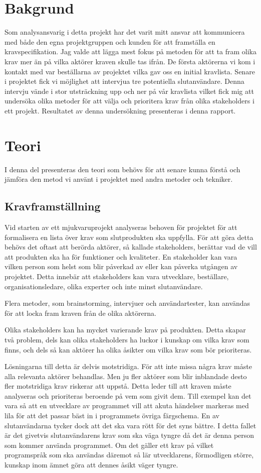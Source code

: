 \section{Bakgrund}
Som analysansvarig i detta projekt har det varit mitt ansvar att kommunicera med både den egna projektgruppen och kunden för att framställa en kravspecifikation. Jag valde att lägga mest fokus på metoden för att ta fram olika krav mer än på vilka aktörer kraven skulle tas ifrån. De första aktörerna vi kom i kontakt med var beställarna av projektet vilka gav oss en initial kravlista. Senare i projektet fick vi möjlighet att intervjua tre potentiella slutanvändare. Denna intervju vände i stor utsträckning upp och ner på vår kravlista vilket fick mig att undersöka olika metoder för att välja och prioritera krav från olika stakeholders i ett projekt. Resultatet av denna undersökning presenteras i denna rapport.

\section{Teori}
I denna del presenteras den teori som behövs för att senare kunna förstå och jämföra den metod vi använt i projektet med andra metoder och tekniker.

\subsection{Kravframställning}
Vid starten av ett mjukvaruprojekt analyseras behoven för projektet för att formalisera en lista över krav som slutprodukten ska uppfylla. För att göra detta behövs det oftast att berörda aktörer, så kallade stakeholders, berättar vad de vill att produkten ska ha för funktioner och kvaliteter. En stakeholder kan vara vilken person som helst som blir påverkad av eller kan påverka utgången av projektet. Detta innebär att stakeholders kan vara  utvecklare, beställare, organisationsledare, olika experter och inte minst slutanvändare.

Flera metoder, som brainstorming, intervjuer och användartester, kan användas för att locka fram kraven från de olika aktörerna.

Olika stakeholders kan ha mycket varierande krav på produkten. Detta skapar två problem, dels kan olika stakeholders ha luckor i kunskap om vilka krav som finns, och dels så kan aktörer ha olika åsikter om vilka krav som bör prioriteras.

Lösningarna till detta är delvis motstridiga. För att inte missa några krav måste alla relevanta aktörer behandlas. Men ju fler aktörer som blir inblandade desto fler motstridiga krav riskerar att uppstå. Detta leder till att kraven måste analyseras och prioriteras beroende på vem som givit dem.
Till exempel kan det vara så att en utvecklare av programmet vill att akuta händelser markeras med lila för att det passar bäst in i programmets övriga färgschema. En av slutanvändarna tycker dock att det ska vara rött för det syns bättre. I detta fallet är det givetvis slutanvändarens krav som ska väga tyngre då det är denna person som kommer använda programmet.
Om det gäller ett krav på vilket programspråk som ska användas däremot så lär utvecklarens, förmodligen större, kunskap inom ämnet göra att dennes åsikt väger tyngre.

